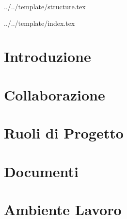 


\def\DOCUMENTO{Norme di Progetto}
\def\VERSIONE{1.0.0}

\def\DESCRIZIONE{Documento contenente l’insieme di norme stabilite dal gruppo \GRUPPO per la realizzazione del progetto didattico \PROGETTO.}

\def\REDATTORE {Bogdan Suierica \\ & Emanuele Crespan}
\def\VERIFICATORE {Matteo Agostinetto}
\def\RESPONSABILE {Valerio Burlin}

\def\USO {Interno}

\def\DISTRIBUZIONE {\GRUPPO{}\\ & \COMMITTENTE{}\\}

\def\DESCRIZIONE {Documento contenente l'insieme di norme stabilite dal gruppo \GRUPPO\ per la realizzazione di \PROGETTO.}


\def\INDICE	{true}
\def\TABELLE {false}
\def\FIGURE {true}


 {../../template/structure.tex}


 {../../template/index.tex}



\section{Introduzione}

\newpage
\section{Collaborazione}

\newpage
\section{Ruoli di Progetto}

\newpage
\section{Documenti}

\newpage
\section{Ambiente Lavoro}


